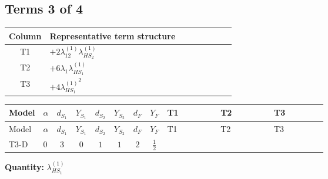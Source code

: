 \documentclass[8pt]{article}
\begin{document}
\begin{landscape}
\subsection*{Terms 3 of 4}
\begin{center}
\begin{tabular}{@{}c >{\raggedright\arraybackslash}p{0.82\linewidth}@{}}
\toprule
Column & Representative term structure \\
\midrule
T1 & \(\displaystyle +2 {\lambda_{12}^{(1)}} {\lambda_{HS_2}^{(1)}}\) \\
\midrule
T2 & \(\displaystyle +6 {\lambda_1} {\lambda_{HS_1}^{(1)}}\) \\
\midrule
T3 & \(\displaystyle +4 {\lambda_{HS_1}^{(1)}}^2\) \\
\midrule
\bottomrule
\end{tabular}
\end{center}
\smallskip
\tiny
\begin{longtable}{@{}llcccccc >{\raggedright\arraybackslash}p{0.21\linewidth} >{\raggedright\arraybackslash}p{0.21\linewidth} >{\raggedright\arraybackslash}p{0.21\linewidth}@{}}
\toprule
Model & $\alpha$ & $d_{S_1}$ & $Y_{S_1}$ & $d_{S_2}$ & $Y_{S_2}$ & $d_F$ & $Y_F$ & T1 & T2 & T3 \\
\midrule
\endfirsthead
\toprule
Model & $\alpha$ & $d_{S_1}$ & $Y_{S_1}$ & $d_{S_2}$ & $Y_{S_2}$ & $d_F$ & $Y_F$ & T1 & T2 & T3 \\
\midrule
\endhead
T3-D & $0$ & $3$ & $0$ & $1$ & $1$ & $2$ & $\frac{1}{2}$ & \scriptsize\adjustbox{max width=\linewidth}{$\begin{gathered} +2 {\lambda_{12}^{(1)}} {\lambda_{HS_2}^{(1)}}\end{gathered}$} & \scriptsize\adjustbox{max width=\linewidth}{$\begin{gathered} +6 {\lambda_1} {\lambda_{HS_1}^{(1)}}\end{gathered}$} & \scriptsize\adjustbox{max width=\linewidth}{$\begin{gathered} +4 {\lambda_{HS_1}^{(1)}}^2\end{gathered}$} \\
\midrule
\bottomrule
\end{longtable}
\clearpage
\noindent\textbf{Quantity: }$\lambda_{HS_1}^{(1)}$\par\smallskip

\end{landscape}
\end{document}
